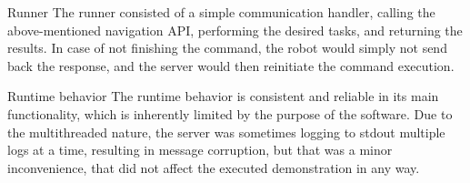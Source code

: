 \secc Runner
The runner consisted of a simple communication handler, calling the above-mentioned navigation API, performing the desired tasks, and returning the results. In case of not finishing the command, the robot would simply not send back the response, and the server would then reinitiate the command execution.

\sec Runtime behavior
The runtime behavior is consistent and reliable in its main functionality, which is inherently limited by the purpose of the software.\br
Due to the multithreaded nature, the server was sometimes logging to stdout multiple logs at a time, resulting in message corruption, but that was a minor inconvenience, that did not affect the executed demonstration in any way.
